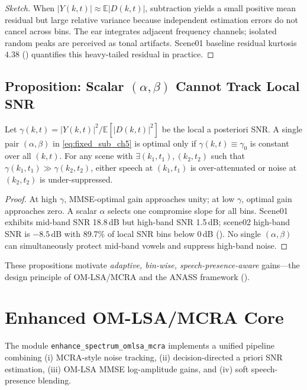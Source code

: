 \begin{proof}[Sketch]
When $|Y(k,t)|\approx \mathbb{E}|D(k,t)|$, subtraction yields a small positive mean residual but large relative variance because independent estimation errors do not cancel across bins. The ear integrates adjacent frequency channels; isolated random peaks are perceived as tonal artifacts. Scene01 baseline residual kurtosis $4.38$ () quantifies this heavy-tailed residual in practice.
\end{proof}

\subsection{Proposition: Scalar $(\alpha,\beta)$ Cannot Track Local SNR}

\begin{proposition}
\label{prop:scalar_alpha}
Let $\gamma(k,t)=|Y(k,t)|^2/\mathbb{E}[|D(k,t)|^2]$ be the local a posteriori SNR. A single pair $(\alpha,\beta)$ in \eqref{eq:fixed_sub_ch5} is optimal only if $\gamma(k,t)\equiv \gamma_0$ is constant over all $(k,t)$. For any scene with $\exists (k_1,t_1),(k_2,t_2)$ such that $\gamma(k_1,t_1)\gg \gamma(k_2,t_2)$, either speech at $(k_1,t_1)$ is over-attenuated or noise at $(k_2,t_2)$ is under-suppressed.
\end{proposition}

\begin{proof}
At high $\gamma$, MMSE-optimal gain approaches unity; at low $\gamma$, optimal gain approaches zero. A scalar $\alpha$ selects one compromise slope for all bins. Scene01 exhibits mid-band SNR 18.8\,dB but high-band SNR 1.5\,dB; scene02 high-band SNR is $-8.5$\,dB with 89.7\% of local SNR bins below 0\,dB (). No single $(\alpha,\beta)$ can simultaneously protect mid-band vowels and suppress high-band noise.
\end{proof}

These propositions motivate \emph{adaptive, bin-wise, speech-presence-aware} gains---the design principle of OM-LSA/MCRA and the ANASS framework ().

\section{Enhanced OM-LSA/MCRA Core}
\label{sec:omlsa_mcra}

The module \texttt{enhance\_spectrum\_omlsa\_mcra} implements a unified pipeline combining (i) MCRA-style noise tracking, (ii) decision-directed a priori SNR estimation, (iii) OM-LSA MMSE log-amplitude gains, and (iv) soft speech-presence blending.

